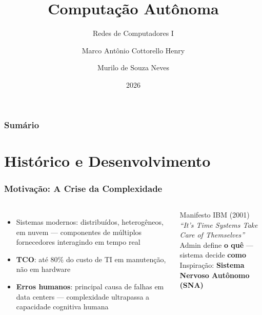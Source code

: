 \documentclass{beamer}
\title{Computação Autônoma}
\subtitle{Redes de Computadores I}
\author[Marco Henry, Murilo Neves]{Marco Antônio Cottorello Henry \and Murilo de Souza Neves}
\institute[UEL]{Universidade Estadual de Londrina}
\date{2026}
\begin{document}
  \frame{\titlepage}

  \begin{frame}
    \frametitle{Sumário}
    \tableofcontents
  \end{frame}

  \section{Histórico e Desenvolvimento}

  \begin{frame}
    \frametitle{Motivação: A Crise da Complexidade}
    \begin{columns}
      \begin{itemize}
        \item Sistemas modernos: distribuídos, heterogêneos, em nuvem --- componentes de múltiplos fornecedores interagindo em tempo real
        \item \textbf{TCO}: até 80\% do custo de TI em manutenção, não em hardware
        \item \textbf{Erros humanos}: principal causa de falhas em data centers --- complexidade \alert{ultrapassa a capacidade cognitiva humana}
      \end{itemize}

      \begin{block}{Manifesto IBM (2001)}
        \textit{``It's Time Systems Take Care of Themselves''}\\[0.3cm]
        Admin define \textbf{o quê} --- sistema decide \textbf{como}\\[0.2cm]
        Inspiração: \textbf{Sistema Nervoso Autônomo (SNA)}
      \end{block}
    \end{columns}
  \end{frame}
\end{document}
